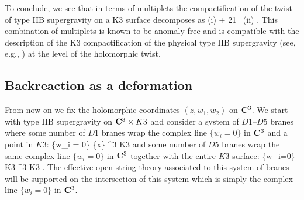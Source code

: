 \documentclass[../main.tex]{subfiles}
\begin{document}
To conclude, we see that in terms of multiplets the compactification of the twist of type IIB supergravity on a K3 surface decomposes as
\beqn
{} \rightsquigarrow (i) + 21 \, (ii) .
\eeqn
This combination of multiplets is known to be anomaly free and is compatible with the description of the K3 compactification of the physical type IIB supergravity (see, e.g., \cite{Townsend:1983xt}) at the level of the holomorphic twist.

\subsection{Backreaction as a deformation} 
\label{sec:conifold}

From now on we fix the holomorphic coordinates $(z,w_1,w_2)$ on $\mathbf{C}^3$.
We start with type IIB supergravity on $\mathbf{C}^3 \times K3$ and consider a system of $D1$--$D5$ branes where some number of $D1$ branes wrap the complex line $\{w_i=0\}$ in $\mathbf{C}^3$ and a point in $K3$:
\beqn
\{w_i = 0\} \times \{x\} \subset \C^3 \times K3 
\eeqn
and some number of $D5$ branes wrap the same complex line $\{w_i=0\}$ in $\mathbf{C}^3$ together with the entire $K3$ surface:
\beqn
\{w_i=0\} \times K3 \subset \C^3 \times K3 .
\eeqn
The effective open string theory associated to this system of branes will be supported on the intersection of this system which is simply the complex line $\{w_i=0\}$ in $\mathbf{C}^3$.
\end{document}
